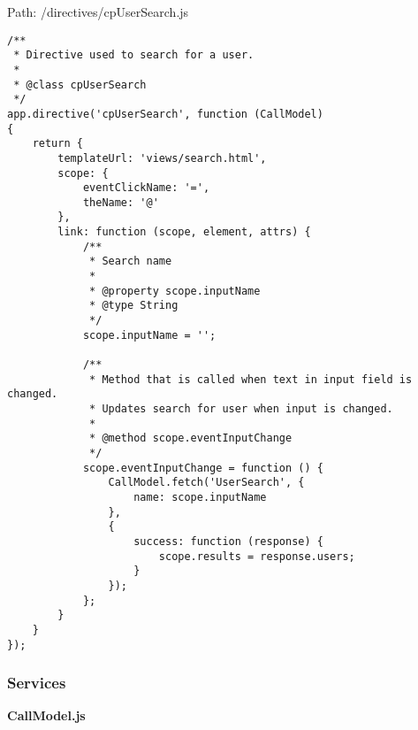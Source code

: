 Path: /directives/cpUserSearch.js
{\scriptsize
\begin{lstlisting}
/**
 * Directive used to search for a user.
 *
 * @class cpUserSearch
 */
app.directive('cpUserSearch', function (CallModel)
{
	return {
		templateUrl: 'views/search.html',
		scope: {
			eventClickName: '=',
			theName: '@'
		},
		link: function (scope, element, attrs) {
			/**
			 * Search name
			 *
			 * @property scope.inputName
			 * @type String
			 */
			scope.inputName = '';

			/**
			 * Method that is called when text in input field is changed.
			 * Updates search for user when input is changed.
			 *
			 * @method scope.eventInputChange
			 */
			scope.eventInputChange = function () {
				CallModel.fetch('UserSearch', {
					name: scope.inputName
				},
				{
					success: function (response) {
						scope.results = response.users;
					}
				});
			};
		}
	}
});\end{lstlisting}
}
\subsubsection{Services}
\textbf{CallModel.js}\label{CallModel.js}

